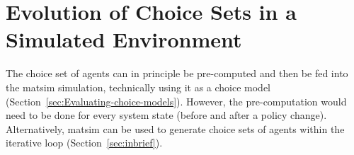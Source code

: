 




\section{Evolution of Choice Sets in a Simulated
Environment}
\label{sec:Evolution-of-choice}

The choice set of agents can in principle be pre-computed and then be fed into the \acrshort{matsim} simulation, technically using it as a choice model (Section~\ref{sec:Evaluating-choice-models}).
%
However, the pre-computation would need to be done for every system state (\eg before and after a policy change). Alternatively, \acrshort{matsim} can be used to generate choice sets of agents within the iterative loop (Section~\ref{sec:inbrief}).
%
%


